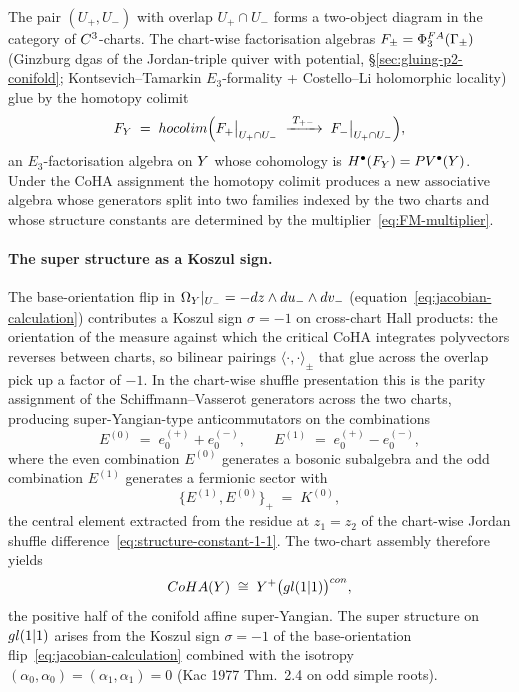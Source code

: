 The pair $(U_+, U_-)$ with overlap $U_+ \cap U_-$ forms a two-object diagram
in the category of $C^3$-charts.  The chart-wise factorisation algebras
$F_\pm = \Phi^{FA}_3(\Gamma_\pm)$ (Ginzburg dgas of the Jordan-triple
quiver with potential, \S\ref{sec:gluing-p2-conifold}; Kontsevich--Tamarkin
$E_3$-formality + Costello--Li holomorphic locality) glue by the homotopy
colimit
\begin{equation}\label{eq:homotopy-colimit}
  F_{Y} \;=\; hocolim\Bigl(
    F_+\big|_{U_+ \cap U_-}
    \;\xrightarrow{\;T_{+-}\;}\;
    F_-\big|_{U_+ \cap U_-}
  \Bigr),
\end{equation}
an $E_3$-factorisation algebra on $Y$ whose cohomology is
$H^\bullet(F_{Y}) = PV^\bullet(Y)$.  Under the CoHA assignment
the homotopy colimit produces a new associative algebra whose generators
split into two families indexed by the two charts and whose structure
constants are determined by the multiplier~\eqref{eq:FM-multiplier}.

\paragraph{The super structure as a Koszul sign.}
The base-orientation flip in $\Omega_{Y}|_{U_-} = -dz \wedge du_-
\wedge dv_-$ (equation~\eqref{eq:jacobian-calculation}) contributes a
Koszul sign $\sigma = -1$ on cross-chart Hall products: the orientation of
the measure against which the critical CoHA integrates polyvectors
reverses between charts, so bilinear pairings $\langle \cdot, \cdot
\rangle_\pm$ that glue across the overlap pick up a factor of $-1$.  In
the chart-wise shuffle presentation this is the parity assignment of
the Schiffmann--Vasserot generators across the two charts, producing
super-Yangian-type anticommutators on the combinations
\[
  E^{(0)} \;=\; e_0^{(+)} + e_0^{(-)},
  \qquad
  E^{(1)} \;=\; e_0^{(+)} - e_0^{(-)},
\]
where the even combination $E^{(0)}$ generates a bosonic subalgebra and the
odd combination $E^{(1)}$ generates a fermionic sector with
\[
  \bigl\{E^{(1)}, E^{(0)}\bigr\}_+ \;=\; K^{(0)},
\]
the central element extracted from the residue at $z_1 = z_2$ of the
chart-wise Jordan shuffle difference~\eqref{eq:structure-constant-1-1}.
The two-chart assembly therefore yields
\begin{equation}\label{eq:conifold-master}
  CoHA(Y) \;\cong\; Y^+\bigl(gl(1|1)\bigr)^{con},
\end{equation}
the positive half of the conifold affine super-Yangian.  The super
structure on $gl(1|1)$ arises from the Koszul sign
$\sigma = -1$ of the base-orientation flip~\eqref{eq:jacobian-calculation}
combined with the isotropy $(\alpha_0, \alpha_0) = (\alpha_1, \alpha_1) = 0$
(Kac 1977 Thm.~2.4 on odd simple roots).

